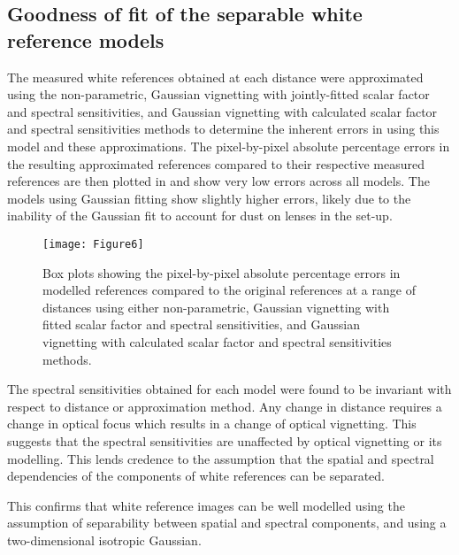 \subsection{Goodness of fit of the separable white reference models}
\label{resultsmodel}
%
%
The measured white references obtained at each distance were approximated using the non-parametric, Gaussian vignetting with jointly-fitted scalar factor and spectral sensitivities, and Gaussian vignetting with calculated scalar factor and spectral sensitivities methods to determine the inherent errors in using this model and these approximations.
The pixel-by-pixel absolute percentage errors in the resulting approximated references compared to their respective measured references are then plotted in  and show very low errors across all models.
The models using Gaussian fitting show slightly higher errors, likely due to the inability of the Gaussian fit to account for dust on lenses in the set-up. 

\begin{figure}[h!]
	\centering
	\texttt{[image: Figure6]}
	\caption{Box plots showing the pixel-by-pixel absolute percentage errors in modelled references compared to the original references at a range of distances using either non-parametric, Gaussian vignetting with fitted scalar factor and spectral sensitivities, and Gaussian vignetting with calculated scalar factor and spectral sensitivities methods.}
	\label{fig:ModelErrors}
\end{figure}

The spectral sensitivities obtained for each model were found to be invariant with respect to distance or approximation method. Any change in distance requires a change in optical focus which results in a change of optical vignetting. This suggests that the spectral sensitivities are unaffected by optical vignetting or its modelling. This lends credence to the assumption that the spatial and spectral dependencies of the components of white references can be separated. 

% 
% 	
% 	
% 	
% 	
% 

This confirms that white reference images can be well modelled using the assumption of separability between spatial and spectral components, and using a two-dimensional isotropic Gaussian.

\FloatBarrier
